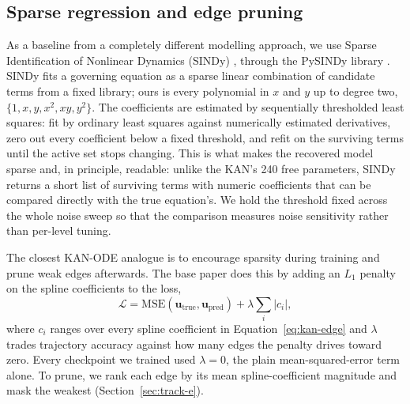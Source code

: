 \subsection{Sparse regression and edge pruning}
\label{sec:sparse-method}

As a baseline from a completely different modelling approach, we use Sparse
Identification of Nonlinear Dynamics (SINDy) \cite{brunton2016sindy},
through the PySINDy library \cite{kaptanoglu2022pysindy}. SINDy fits a
governing equation as a sparse linear combination of candidate terms from a
fixed library; ours is every polynomial in $x$ and $y$ up to degree two,
$\{1,x,y,x^2,xy,y^2\}$. The coefficients are estimated by sequentially
thresholded least squares: fit by ordinary least squares against
numerically estimated derivatives, zero out every coefficient below a fixed
threshold, and refit on the surviving terms until the active set stops
changing. This is what makes the recovered model sparse and, in principle,
readable: unlike the KAN's 240 free parameters, SINDy returns a short list
of surviving terms with numeric coefficients that can be compared directly
with the true equation's. We hold the threshold fixed across the whole noise
sweep so that the comparison measures noise sensitivity rather than
per-level tuning.

The closest KAN-ODE analogue is to encourage sparsity during training and
prune weak edges afterwards. The base paper does this by adding an $L_1$
penalty on the spline coefficients to the loss,
\begin{equation}
\mathcal{L} = \mathrm{MSE}(\mathbf{u}_{\text{true}}, \mathbf{u}_{\text{pred}}) + \lambda\sum_{i} |c_i|,
\label{eq:l1-sparsity}
\end{equation}
where $c_i$ ranges over every spline coefficient in
Equation~\ref{eq:kan-edge} and $\lambda$ trades trajectory accuracy against
how many edges the penalty drives toward zero. Every checkpoint we trained
used $\lambda=0$, the plain mean-squared-error term alone. To prune, we rank
each edge by its mean spline-coefficient magnitude and mask the weakest
(Section~\ref{sec:track-e}).
